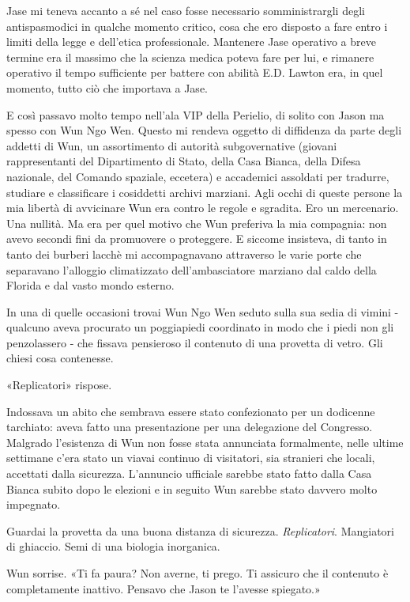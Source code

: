 Jase mi teneva accanto a sé nel caso fosse necessario somministrargli
degli antispasmodici in qualche momento critico, cosa che ero disposto a
fare entro i limiti della legge e dell'etica professionale. Mantenere
Jase operativo a breve termine era il massimo che la scienza medica
poteva fare per lui, e rimanere operativo il tempo sufficiente per
battere con abilità E.D. Lawton era, in quel momento, tutto ciò che
importava a Jase.

E così passavo molto tempo nell'ala VIP della Perielio, di solito con
Jason ma spesso con Wun Ngo Wen. Questo mi rendeva oggetto di diffidenza
da parte degli addetti di Wun, un assortimento di autorità
subgovernative (giovani rappresentanti del Dipartimento di Stato, della
Casa Bianca, della Difesa nazionale, del Comando spaziale, eccetera) e
accademici assoldati per tradurre, studiare e classificare i cosiddetti
archivi marziani. Agli occhi di queste persone la mia libertà di
avvicinare Wun era contro le regole e sgradita. Ero un mercenario. Una
nullità. Ma era per quel motivo che Wun preferiva la mia compagnia: non
avevo secondi fini da promuovere o proteggere. E siccome insisteva, di
tanto in tanto dei burberi lacchè mi accompagnavano attraverso le varie
porte che separavano l'alloggio climatizzato dell'ambasciatore marziano
dal caldo della Florida e dal vasto mondo esterno.

In una di quelle occasioni trovai Wun Ngo Wen seduto sulla sua sedia di
vimini - qualcuno aveva procurato un poggiapiedi coordinato in modo che
i piedi non gli penzolassero - che fissava pensieroso il contenuto di
una provetta di vetro. Gli chiesi cosa contenesse.

«Replicatori» rispose.

Indossava un abito che sembrava essere stato confezionato per un
dodicenne tarchiato: aveva fatto una presentazione per una delegazione
del Congresso. Malgrado l'esistenza di Wun non fosse stata annunciata
formalmente, nelle ultime settimane c'era stato un viavai continuo di
visitatori, sia stranieri che locali, accettati dalla sicurezza.
L'annuncio ufficiale sarebbe stato fatto dalla Casa Bianca subito dopo
le elezioni e in seguito Wun sarebbe stato davvero molto impegnato.

Guardai la provetta da una buona distanza di sicurezza.
\emph{Replicatori}. Mangiatori di ghiaccio. Semi di una biologia
inorganica.

Wun sorrise. «Ti fa paura? Non averne, ti prego. Ti assicuro che il
contenuto è completamente inattivo. Pensavo che Jason te l'avesse
spiegato.»

